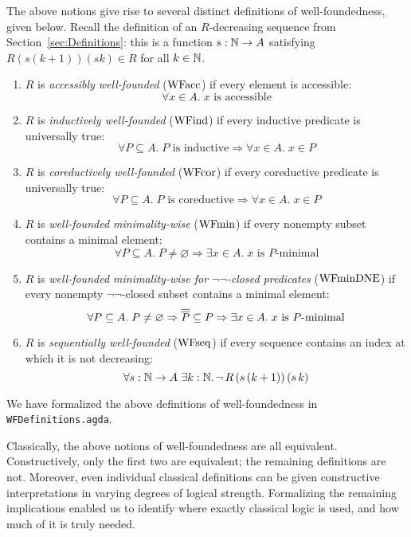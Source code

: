 The above notions give rise to several distinct definitions of well-foundedness, given below.
Recall the definition of an $R$-decreasing sequence from Section~\ref{sec:Definitions}:
this is a function $s : \mathbb{N} \to A$ satisfying $R(s(k+1))(sk) \in R$ for all $k \in \mathbb{N}$.

\begin{definition} \label{def:WFproperties} \hfill
  \begin{enumerate}
    \item $R$ is \emph{accessibly well-founded} ($\mathrm{WFacc}$) if every element is accessible:
      \[
        \forall x \in A.\; x \text{ is accessible}
      \]
    \item \label{def:WFind} $R$ is \emph{inductively well-founded} ($\mathrm{WFind}$) if every inductive predicate is universally true:
      \[
        \forall P \subseteq A.\;\text{$P$ is inductive} \Rightarrow \forall x \in A.\; x \in P
      \]
    \item $R$ is \emph{coreductively well-founded} ($\mathrm{WFcor}$) if every coreductive predicate is universally true:
      \[
        \forall P \subseteq A.\;\text{$P$ is coreductive} \Rightarrow \forall x \in A.\; x \in P
      \]
    \item  $R$ is \emph{well-founded minimality-wise} ($\mathrm{WFmin}$) if every nonempty subset contains a minimal element:
      \[
        \forall P \subseteq A.\; P \neq \varnothing \Rightarrow
        \exists x \in A.\; \text{$x$ is $P$-minimal}
      \]
    \item  $R$ is \emph{well-founded minimality-wise for $\lnot \lnot$-closed predicates} ($\mathrm{WFminDNE}$) if every nonempty $\lnot \lnot$-closed subset contains a minimal element:
      \[
        \forall P \subseteq A.\; P \neq \varnothing \Rightarrow \overline{\overline{P}} \subseteq P \Rightarrow
        \exists x \in A.\; \text{$x$ is $P$-minimal}
      \]
   \item $R$ is \emph{sequentially well-founded} ($\mathrm{WFseq}$) if every sequence contains an index at which it is not decreasing:
      \[
        \forall s : \mathbb{N} \to A\ \exists k : \mathbb{N}.\, \lnot \, R \,(s\,(k+1))\,(s\,k)
      \]
  \end{enumerate}
\end{definition}
We have formalized the above definitions of well-foundedness in \texttt{WFDefinitions.agda}.

Classically, the above notions of well-foundedness are all equivalent.  Constructively, only the first two are equivalent; the remaining definitions are not. Moreover, even individual classical definitions can be given constructive
interpretations in varying degrees of logical strength.
Formalizing the remaining implications enabled us to identify where exactly classical logic
is used, and how much of it is truly needed.

